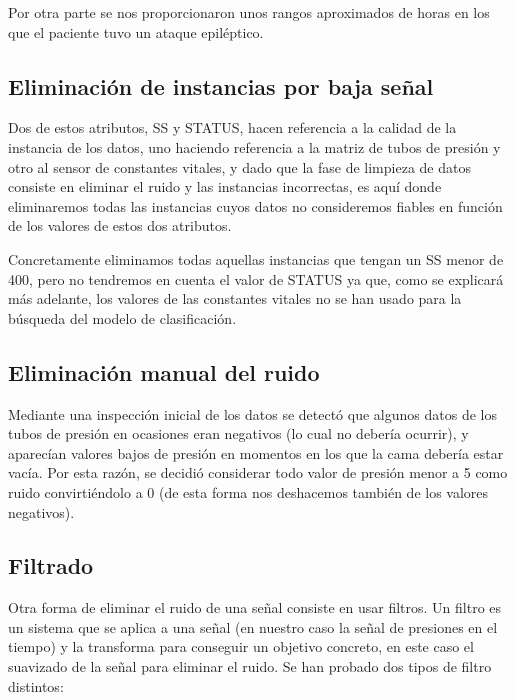 Por otra parte se nos proporcionaron unos rangos aproximados de horas en los que el paciente tuvo un ataque epiléptico. 

\subsection{Eliminación de instancias por baja señal}

Dos de estos atributos, SS y STATUS, hacen referencia a la calidad de la instancia de los datos, uno haciendo referencia a la matriz de tubos de presión y otro al sensor de constantes vitales, y dado que la fase de limpieza de datos consiste en eliminar el ruido y las instancias incorrectas, es aquí donde eliminaremos todas las instancias cuyos datos no consideremos fiables en función de los valores de estos dos atributos. 

Concretamente eliminamos todas aquellas instancias que tengan un SS menor de 400, pero no tendremos en cuenta el valor de STATUS ya que, como se explicará más adelante, los valores de las constantes vitales no se han usado para la búsqueda del modelo de clasificación.

\subsection{Eliminación manual del ruido}

Mediante una inspección inicial de los datos se detectó que algunos datos de los tubos de presión en ocasiones eran negativos (lo cual no debería ocurrir), y aparecían valores bajos de presión en momentos en los que la cama debería estar vacía. Por esta razón, se decidió considerar todo valor de presión menor a 5 como ruido convirtiéndolo a 0 (de esta forma nos deshacemos también de los valores negativos). 

\subsection{Filtrado}

Otra forma de eliminar el ruido de una señal consiste en usar filtros. Un filtro es un sistema que se aplica a una señal (en nuestro caso la señal de presiones en el tiempo) y la transforma para conseguir un objetivo concreto, en este caso el suavizado de la señal para eliminar el ruido. Se han probado dos tipos de filtro distintos: 

